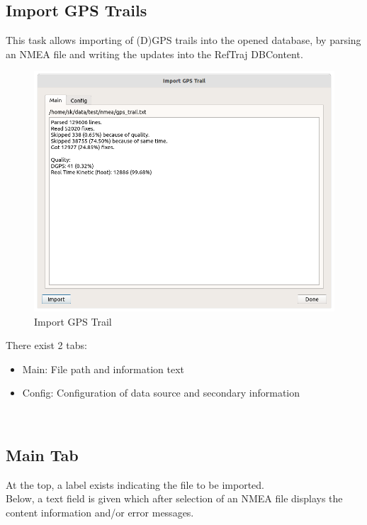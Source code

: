 \subsection{Import GPS Trails}
\label{sec:ui_import_gps}

This task allows importing of (D)GPS trails into the opened database, by parsing an NMEA file and writing the updates into the RefTraj DBContent.

\begin{figure}[H]
  \center
    \includegraphics[width=16cm]{figures/gps_import_task.png}
  \caption{Import GPS Trail}
\end{figure}

There exist 2 tabs:

\begin{itemize}
\item Main: File path and information text
\item Config: Configuration of data source and secondary information
\end{itemize}
\ \\

\subsection{Main Tab}

At the top, a label exists indicating the file to be imported. \\

Below, a text field is given which after selection of an NMEA file displays the content information and/or error messages. \\

